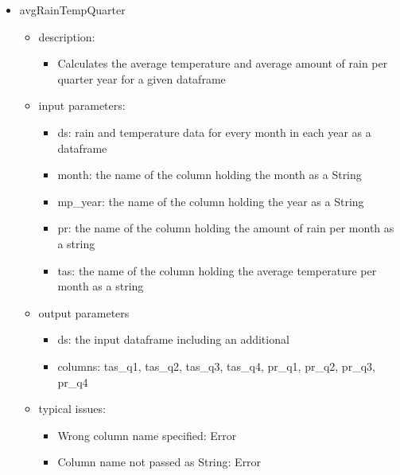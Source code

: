 \documentclass[12pt,a4paper,english]{article}
\begin{document}
\begin{itemize}
\item avgRainTempQuarter
	\begin{itemize}
	\item description: 
		\begin{itemize}
		\item Calculates the average temperature and average amount of rain per quarter year for a given dataframe
		\end{itemize}
	\item input parameters: 
		\begin{itemize}
		\item ds: rain and temperature data for every month in each year as a dataframe
		\item month: the name of the column holding the month as a String       
		\item mp\_year: the name of the column holding the year as a String 
		\item pr: the name of the column holding the amount of rain per month as a string
		\item tas: the name of the column holding the average temperature per month as a string
		\end{itemize}
	\item output parameters
		\begin{itemize}
		\item ds: the input dataframe including an additional
		\item columns: tas\_q1, tas\_q2, tas\_q3, tas\_q4, pr\_q1, pr\_q2, pr\_q3, pr\_q4
		\end{itemize}
	\item typical issues:
		\begin{itemize}
		\item Wrong column name specified: Error 
		\item Column name not passed as String: Error
		\end{itemize}
	\end{itemize}


\end{itemize}
\end{document}
